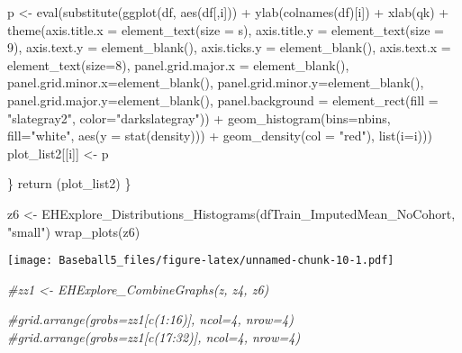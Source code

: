 \documentclass[
]{article}
\newenvironment{Shaded}{\begin{snugshade}}{\end{snugshade}}
\newcommand{\AttributeTok}[1]{\textcolor[rgb]{0.77,0.63,0.00}{#1}}
\newcommand{\CommentTok}[1]{\textcolor[rgb]{0.56,0.35,0.01}{\textit{#1}}}
\newcommand{\DecValTok}[1]{\textcolor[rgb]{0.00,0.00,0.81}{#1}}
\newcommand{\FunctionTok}[1]{\textcolor[rgb]{0.00,0.00,0.00}{#1}}
\newcommand{\NormalTok}[1]{#1}
\newcommand{\OtherTok}[1]{\textcolor[rgb]{0.56,0.35,0.01}{#1}}
\newcommand{\SpecialCharTok}[1]{\textcolor[rgb]{0.00,0.00,0.00}{#1}}
\newcommand{\StringTok}[1]{\textcolor[rgb]{0.31,0.60,0.02}{#1}}
\begin{document}
\begin{Shaded}
\begin{Highlighting}[]
\NormalTok{  p }\OtherTok{\textless{}{-}} \FunctionTok{eval}\NormalTok{(}\FunctionTok{substitute}\NormalTok{(}\FunctionTok{ggplot}\NormalTok{(df, }\FunctionTok{aes}\NormalTok{(df[,i])) }\SpecialCharTok{+}
          \FunctionTok{ylab}\NormalTok{(}\FunctionTok{colnames}\NormalTok{(df)[i])  }\SpecialCharTok{+}
          \FunctionTok{xlab}\NormalTok{(qk) }\SpecialCharTok{+}
          \FunctionTok{theme}\NormalTok{(}\AttributeTok{axis.title.x =} \FunctionTok{element\_text}\NormalTok{(}\AttributeTok{size =}\NormalTok{ s), }\AttributeTok{axis.title.y =} \FunctionTok{element\_text}\NormalTok{(}\AttributeTok{size =} \DecValTok{9}\NormalTok{), }\AttributeTok{axis.text.y =} \FunctionTok{element\_blank}\NormalTok{(), }\AttributeTok{axis.ticks.y =} \FunctionTok{element\_blank}\NormalTok{(), }\AttributeTok{axis.text.x =} \FunctionTok{element\_text}\NormalTok{(}\AttributeTok{size=}\DecValTok{8}\NormalTok{),  }\AttributeTok{panel.grid.major.x =} \FunctionTok{element\_blank}\NormalTok{(), }\AttributeTok{panel.grid.minor.x=}\FunctionTok{element\_blank}\NormalTok{(), }\AttributeTok{panel.grid.minor.y=}\FunctionTok{element\_blank}\NormalTok{(), }\AttributeTok{panel.grid.major.y=}\FunctionTok{element\_blank}\NormalTok{(), }\AttributeTok{panel.background =} \FunctionTok{element\_rect}\NormalTok{(}\AttributeTok{fill =} \StringTok{"slategray2"}\NormalTok{, }\AttributeTok{color=}\StringTok{"darkslategray"}\NormalTok{))  }\SpecialCharTok{+} 
  \FunctionTok{geom\_histogram}\NormalTok{(}\AttributeTok{bins=}\NormalTok{nbins, }\AttributeTok{fill=}\StringTok{"white"}\NormalTok{, }\FunctionTok{aes}\NormalTok{(}\AttributeTok{y =} \FunctionTok{stat}\NormalTok{(density))) }\SpecialCharTok{+}
      \FunctionTok{geom\_density}\NormalTok{(}\AttributeTok{col =} \StringTok{"red"}\NormalTok{), }\FunctionTok{list}\NormalTok{(}\AttributeTok{i=}\NormalTok{i)))}
\NormalTok{  plot\_list2[[i]] }\OtherTok{\textless{}{-}}\NormalTok{ p }
  
\NormalTok{\}}
\FunctionTok{return}\NormalTok{ (plot\_list2)}
\NormalTok{\}}

\NormalTok{z6 }\OtherTok{\textless{}{-}} \FunctionTok{EHExplore\_Distributions\_Histograms}\NormalTok{(dfTrain\_ImputedMean\_NoCohort, }\StringTok{"small"}\NormalTok{)}
\FunctionTok{wrap\_plots}\NormalTok{(z6)}
\end{Highlighting}
\end{Shaded}

\texttt{[image: Baseball5\_files/figure-latex/unnamed-chunk-10-1.pdf]}

\begin{Shaded}
\begin{Highlighting}[]
\CommentTok{\#zz1 \textless{}{-} EHExplore\_CombineGraphs(z, z4, z6)}

\CommentTok{\#grid.arrange(grobs=zz1[c(1:16)],  ncol=4, nrow=4)}
\CommentTok{\#grid.arrange(grobs=zz1[c(17:32)],  ncol=4, nrow=4)}
\end{Highlighting}
\end{Shaded}
\end{document}
